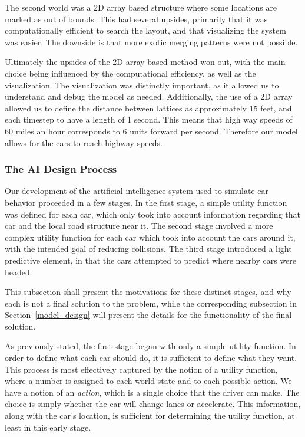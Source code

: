 \documentclass[a4paper, 11pt]{article}
\begin{document}
The second world was a 2D array based structure where some locations are marked as out of bounds. This had several upsides, primarily that it was computationally efficient to search the layout, and that visualizing the system was easier. The downside is that more exotic merging patterns were not possible. 

Ultimately the upsides of the 2D array based method won out, with the main choice being influenced by the computational efficiency, as well as the visualization. The visualization was distinctly important, as it allowed us to understand and debug the model as needed. Additionally, the use of a 2D array allowed us to define the distance between lattices as approximately 15 feet, and each timestep to have a length of 1 second. This means that high way speeds of 60 miles an hour corresponds to 6 units forward per second. Therefore our model allows for the cars to reach highway speeds. 


\subsubsection{The AI Design Process}
\label{ai_design}
Our development of the artificial intelligence system used to simulate car behavior proceeded in a few stages. In the first stage,
a simple utility function was defined for each car, which only took into account information regarding that car and 
the local road structure near it. The second stage involved a more complex utility function for each car which took into account the cars around it, 
with the intended goal of reducing collisions. The third stage introduced a light predictive element, in that the cars attempted to 
predict where nearby cars were headed. 

This subsection shall present the motivations for these distinct stages, and why each is not a final solution to the problem, 
while the corresponding subsection in Section~\ref{model_design} will present the details for the functionality of the final solution.  

As previously stated, the first stage began with only a simple utility function. 
In order to define what each car should do, it is sufficient to define what they want. This process is most effectively 
captured by the notion of a utility function, where a number is assigned to each world state and to each possible action.
We have a notion of an \textit{action}, which is a single choice that the driver can make. 
The choice is simply whether the car will change lanes or accelerate.
This information, along with the car's location, is sufficient for determining the utility function, 
at least in this early stage. 
\end{document}
